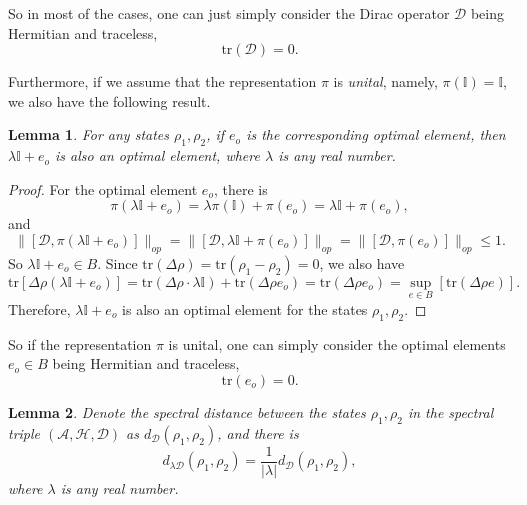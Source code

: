 \documentclass[a4paper,12pt]{article}
\newtheorem{lemma}{Lemma}
\begin{document}
So in most of the cases, one can just simply consider the Dirac
operator $\mathcal{D}$ being Hermitian and traceless,
\begin{equation}
  \mathrm{tr} (\mathcal{D}) = 0.
\end{equation}


Furthermore, if we assume that the representation $\pi$ is
\textit{unital}, namely, $\pi (\mathbb{I}) =\mathbb{I}$, we also
have the following result.

\begin{lemma}
  \label{tloe}For any states $\rho_1, \rho_2$, if $e_o$ is the corresponding
  optimal element, then $\lambda \mathbb{I}+ e_o$ is also an optimal element,
  where $\lambda$ is any real number.
\end{lemma}

\begin{proof}
For the optimal element $e_o$, there is
\begin{equation}
  \pi (\lambda \mathbb{I}+ e_o) = \lambda \pi (\mathbb{I}) + \pi (e_o) =
  \lambda \mathbb{I}+ \pi (e_o),
\end{equation}
and
\begin{equation}
  \|[\mathcal{D}, \pi (\lambda \mathbb{I}+ e_o)]\|_{op} = \|[\mathcal{D},
  \lambda \mathbb{I}+ \pi (e_o)]\|_{op} = \|[\mathcal{D}, \pi (e_o)]\|_{op}
  \leqslant 1.
\end{equation}
So $\lambda \mathbb{I}+ e_o \in B$. Since $\mathrm{tr} (\Delta\rho)=\mathrm{tr} (\rho_1-\rho_2)=0$, we also have
\begin{equation}
  \mathrm{tr} [\Delta \rho (\lambda \mathbb{I}+ e_o)] = \mathrm{tr} (\Delta
  \rho \cdot \lambda \mathbb{I}) + \mathrm{tr} (\Delta \rho e_o) = \mathrm{tr}
  (\Delta \rho e_o) = \sup_{e \in B} [\mathrm{tr} (\Delta \rho e)] .
\end{equation}
Therefore, $\lambda \mathbb{I}+ e_o$ is also an optimal element for the states
$\rho_1, \rho_2$.
\end{proof}

So if the representation $\pi$ is unital, one can simply consider the optimal elements $e_o \in B$
being Hermitian and traceless,
\begin{equation}
  \mathrm{tr} (e_o) = 0.
\end{equation}
\begin{lemma}
  Denote the spectral distance between the states $\rho_1, \rho_2$ in the spectral
  triple $(\mathcal{A}, \mathcal{H}, \mathcal{D})$ as $d_{\mathcal{D}}
  (\rho_1, \rho_2)$, and there is
  \begin{equation}
    d_{\lambda \mathcal{D}} (\rho_1, \rho_2) = \frac{1}{| \lambda |}
    d_{\mathcal{D}} (\rho_1, \rho_2),
  \end{equation}
  where $\lambda$ is any real number.
\end{lemma}
\end{document}
